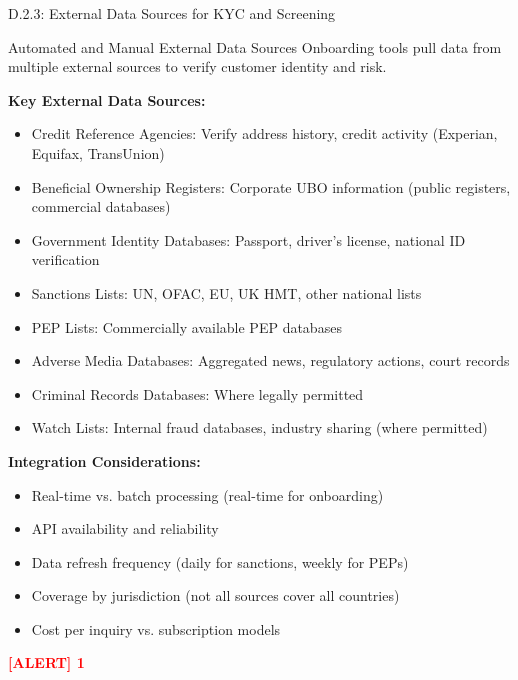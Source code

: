 \documentclass[11pt,a4paper]{beamer}
\newcommand{\redflag}[1]{\textcolor{red}{\textbf{[ALERT] 1}}}
\begin{document}
\begin{frame}{D.2.3: External Data Sources for KYC and Screening}
	\begin{block}{Automated and Manual External Data Sources}
		Onboarding tools pull data from multiple external sources to verify customer identity and risk.
	\end{block}
	\textbf{Key External Data Sources:}
	\begin{itemize}
		\item Credit Reference Agencies: Verify address history, credit activity (Experian, Equifax, TransUnion)
		\item Beneficial Ownership Registers: Corporate UBO information (public registers, commercial databases)
		\item Government Identity Databases: Passport, driver's license, national ID verification
		\item Sanctions Lists: UN, OFAC, EU, UK HMT, other national lists
		\item PEP Lists: Commercially available PEP databases
		\item Adverse Media Databases: Aggregated news, regulatory actions, court records
		\item Criminal Records Databases: Where legally permitted
		\item Watch Lists: Internal fraud databases, industry sharing (where permitted)
	\end{itemize}
	\textbf{Integration Considerations:}
	\begin{itemize}
		\item Real-time vs. batch processing (real-time for onboarding)
		\item API availability and reliability
		\item Data refresh frequency (daily for sanctions, weekly for PEPs)
		\item Coverage by jurisdiction (not all sources cover all countries)
		\item Cost per inquiry vs. subscription models
	\end{itemize}
	\redflag{No single data source is sufficient - banks should use multiple sources for triangulation.}
\end{frame}
\end{document}
